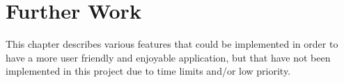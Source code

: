 \chapter{Further Work}
\label{chap:furtherwork}

This chapter describes various features that could be implemented in order to have a 
more user friendly and enjoyable application, but that have not been implemented in 
this project due to time limits and/or low priority.